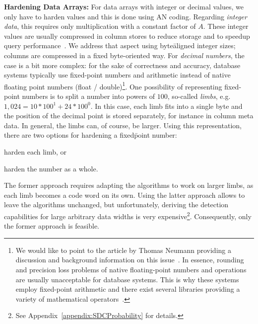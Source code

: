 
\textbf{Hardening Data Arrays:}
For data arrays with integer or decimal values, we only have to harden values and this is done using AN coding. Regarding \textit{integer data}, this requires only multiplication with a constant factor of \(A\). These integer values are usually compressed in column stores to reduce storage and to speedup query performance~\cite{DBLP:conf/sigmod/AbadiMF06,DBLP:journals/ftdb/AbadiBHIM13,Feng:2015:BPE:2723372.2747642,Li:2013:BFS:2463676.2465322,DBLP:conf/icde/ZukowskiWB12,DBLP:conf/icde/ZukowskiHNB06}. We address that aspect using byte\=aligned integer sizes; columns are compressed in a fixed byte-oriented way. For \textit{decimal numbers}, the case is a bit more complex: for the sake of correctness and accuracy, database systems typically use fixed-point numbers and arithmetic instead of native floating point numbers (float / double)\footnote{We would like to point to the article by Thomas Neumann providing a discussion and background information on this issue~\cite{blogfloatingpoint}. In essence, rounding and precision loss problems of native floating-point numbers and operations are usually unacceptable for database systems. This is why these systems employ fixed-point arithmetic and there exist several libraries providing a variety of mathematical operators~\cite{gmp,mpir,mapm}.}. One possibility of representing fixed-point numbers is to split a number into powers of $100$, so-called \emph{limbs}, e.g. \(1,024 = 10 * 100^1 + 24 * 100^0\). In this case, each limb fits into a single byte and the position of the decimal point is stored separately, for instance in column meta data. In general, the limbs can, of course, be larger. Using this representation, there are two options for hardening a fixed\=point number: \begin{inparaenum} \item harden each limb, or \item harden the number as a whole. \end{inparaenum} The former approach requires adapting the algorithms to work on larger limbs, as each limb becomes a code word on its own. Using the latter approach allows to leave the algorithms unchanged, but unfortunately, deriving the detection capabilities for large arbitrary data widths is very expensive\footnote{See Appendix~\ref{appendix:SDCProbability} for details.}. Consequently, only the former approach is feasible.

